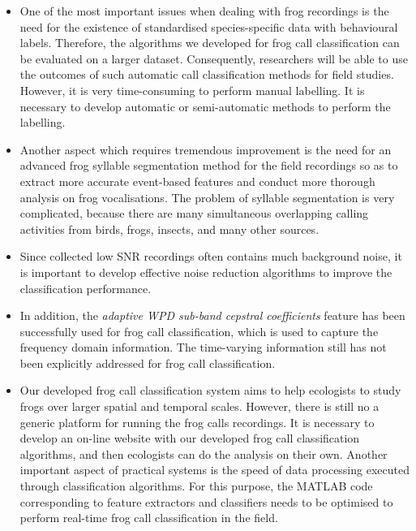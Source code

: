 \begin{itemize}
\item  One of the most important issues when dealing with frog recordings is the need for the existence of standardised species-specific data with behavioural labels. 
Therefore, the algorithms we developed for frog call classification can be evaluated on a larger dataset. Consequently, researchers will be able to use the outcomes of such automatic call classification methods for field studies. However, it is very time-consuming to perform manual labelling. It is necessary to develop automatic or semi-automatic methods to perform the labelling.

\item  Another aspect which requires tremendous improvement is the need for an advanced frog syllable segmentation method for the field recordings so as to extract more accurate event-based features and conduct more thorough analysis on frog vocalisations. The problem of syllable segmentation is very complicated, because there are many simultaneous overlapping calling activities from birds, frogs, insects, and many other sources. 

\item Since collected low SNR recordings often contains much background noise, it is important to develop effective noise reduction algorithms to improve the classification performance.



\item In addition, the \textit{adaptive WPD sub-band cepstral coefficients} feature has been successfully used for frog call classification, which is used to capture the frequency domain information. The time-varying information still has not been explicitly addressed for frog call classification. 




\item Our developed frog call classification system aims to help ecologists to study frogs over larger spatial and temporal scales. However, there is still no a generic platform for running the frog calls recordings. It is necessary to develop an on-line website with our developed frog call classification algorithms, and then ecologists can do the analysis on their own. Another important aspect of practical systems is the speed of data processing executed through classification algorithms. For this purpose, the MATLAB code corresponding to feature extractors and classifiers needs to be optimised to perform real-time frog call classification in the field.


\end{itemize}










